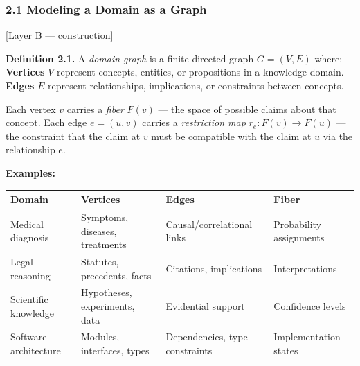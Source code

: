 \documentclass[
]{article}
\begin{document}
\subsubsection{2.1 Modeling a Domain as a
Graph}\label{modeling-a-domain-as-a-graph}

{[}Layer B --- construction{]}

\textbf{Definition 2.1.} A \emph{domain graph} is a finite directed
graph \(G = (V, E)\) where: - \textbf{Vertices} \(V\) represent
concepts, entities, or propositions in a knowledge domain. -
\textbf{Edges} \(E\) represent relationships, implications, or
constraints between concepts.

Each vertex \(v\) carries a \emph{fiber} \(F(v)\) --- the space of
possible claims about that concept. Each edge \(e = (u, v)\) carries a
\emph{restriction map} \(r_e: F(v) \to F(u)\) --- the constraint that
the claim at \(v\) must be compatible with the claim at \(u\) via the
relationship \(e\).

\textbf{Examples:}

\begin{longtable}[]{@{}
  >{\raggedright\arraybackslash}p{}
  >{\raggedright\arraybackslash}p{}
  >{\raggedright\arraybackslash}p{}
  >{\raggedright\arraybackslash}p{}@{}}
\toprule\noalign{}
\begin{minipage}[b]{\linewidth}\raggedright
Domain
\end{minipage} & \begin{minipage}[b]{\linewidth}\raggedright
Vertices
\end{minipage} & \begin{minipage}[b]{\linewidth}\raggedright
Edges
\end{minipage} & \begin{minipage}[b]{\linewidth}\raggedright
Fiber
\end{minipage} \\
\midrule\noalign{}
\endhead
\bottomrule\noalign{}
\endlastfoot
Medical diagnosis & Symptoms, diseases, treatments &
Causal/correlational links & Probability assignments \\
Legal reasoning & Statutes, precedents, facts & Citations, implications
& Interpretations \\
Scientific knowledge & Hypotheses, experiments, data & Evidential
support & Confidence levels \\
Software architecture & Modules, interfaces, types & Dependencies, type
constraints & Implementation states \\
\end{longtable}
\end{document}
